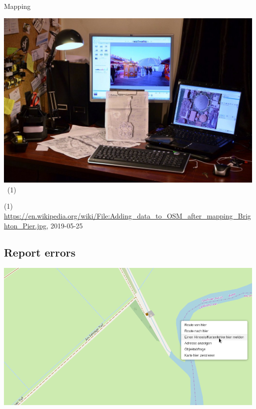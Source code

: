 \documentclass{beamer}
\begin{document}
	\begin{frame}{Mapping}
		\begin{center}
			\includegraphics[width=0.8\linewidth,height=0.8\textheight,keepaspectratio]{images/mapping_outdoor}~\tiny{(1)}
		\end{center}
		{\tiny (1) \url{https://en.wikipedia.org/wiki/File:Adding\_data\_to\_OSM\_after\_mapping\_Brighton\_Pier.jpg}, 2019-05-25}
	\end{frame}
	
	\subsection{Report errors}
	
	\begin{frame}
		\begin{center}
			\includegraphics[width=\linewidth,height=\textheight,keepaspectratio]{images/report-error-menu}
		\end{center}
	\end{frame}
	
\end{document}
